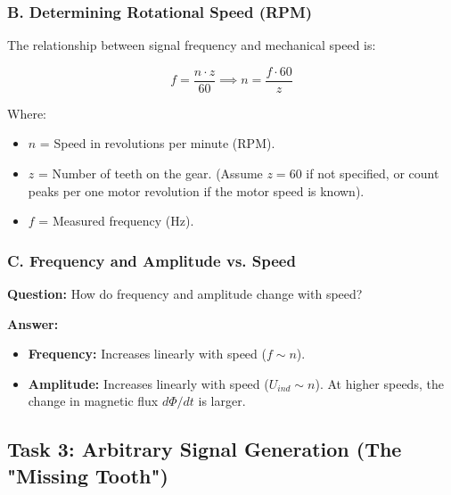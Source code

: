 \documentclass[a4paper,12pt]{article}
\begin{document}
\subsubsection{B. Determining Rotational Speed (RPM)}

The relationship between signal frequency and mechanical speed is:

\begin{equation}

    f = \frac{n \cdot z}{60} \implies n = \frac{f \cdot 60}{z}

\end{equation}

Where:

\begin{itemize}

    \item $n$ = Speed in revolutions per minute (RPM).

    \item $z$ = Number of teeth on the gear. (Assume $z=60$ if not specified, or count peaks per one motor revolution if the motor speed is known).

    \item $f$ = Measured frequency (Hz).

\end{itemize}



\subsubsection{C. Frequency and Amplitude vs. Speed~\cite{ref42}}

\textbf{Question:} How do frequency and amplitude change with speed?

\textbf{Answer:}

\begin{itemize}

    \item \textbf{Frequency:} Increases linearly with speed ($f \sim n$).

    \item \textbf{Amplitude:} Increases linearly with speed ($U_{ind} \sim n$). At higher speeds, the change in magnetic flux $d\Phi/dt$ is larger.

\end{itemize}



\subsection{Task 3: Arbitrary Signal Generation (The "Missing Tooth")}
\end{document}

